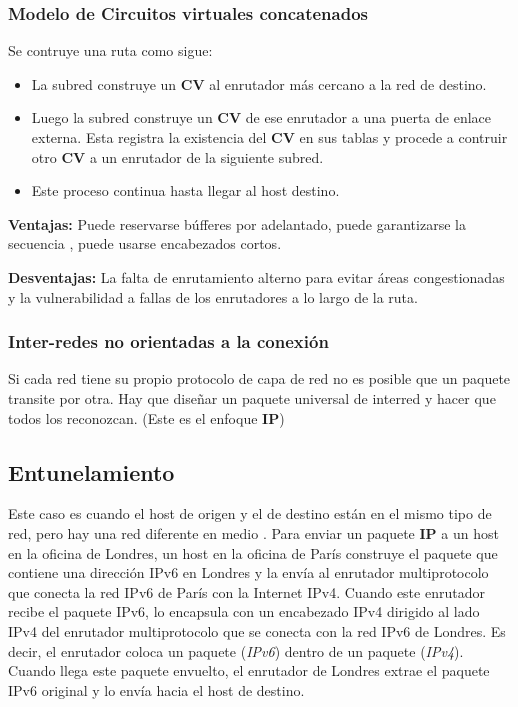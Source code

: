 \documentclass[10pt,a4paper]{report}
\begin{document}
	\subsubsection{Modelo de Circuitos virtuales concatenados}
	Se contruye una ruta como sigue:
	\begin{itemize}
		\item La subred construye un \textbf{CV} al enrutador más cercano a la red de destino.
		\item Luego la subred construye un \textbf{CV} de ese enrutador a una puerta de enlace externa. Esta registra la existencia del \textbf{CV} en sus tablas y procede a contruir otro \textbf{CV} a un enrutador de la siguiente subred.
		\item Este proceso continua hasta llegar al host destino.
	\end{itemize}

	\par \textbf{Ventajas:} Puede reservarse búfferes por adelantado, puede garantizarse la secuencia , puede usarse encabezados cortos.
	\par \textbf{Desventajas:} La falta de enrutamiento alterno para evitar áreas congestionadas y la vulnerabilidad a fallas de los enrutadores a lo largo de la ruta.

	\subsubsection{Inter-redes no orientadas a la conexión}
	Si cada red tiene su propio protocolo de capa de red no es posible que un paquete transite por otra. Hay que diseñar un paquete universal de interred y hacer que todos los reconozcan. (Este es el enfoque \textbf{IP})

	\subsection{Entunelamiento}
	Este caso es cuando el host de origen y el de destino están en el mismo tipo de red, pero hay una red diferente en medio	.
	Para enviar un paquete \textbf{IP} a un host en la oficina de Londres, un host en la oficina de París construye el paquete que contiene
una dirección IPv6 en Londres y la envía al enrutador multiprotocolo que conecta la red IPv6 de París con
la Internet IPv4. Cuando este enrutador recibe el paquete IPv6, lo encapsula con un encabezado IPv4 dirigido al lado IPv4 del enrutador multiprotocolo que se conecta con la red IPv6 de Londres. Es decir, el
enrutador coloca un paquete (\textit{IPv6}) dentro de un paquete (\textit{IPv4}). Cuando llega este paquete envuelto,
el enrutador de Londres extrae el paquete IPv6 original y lo envía hacia el host de destino.
\end{document}
